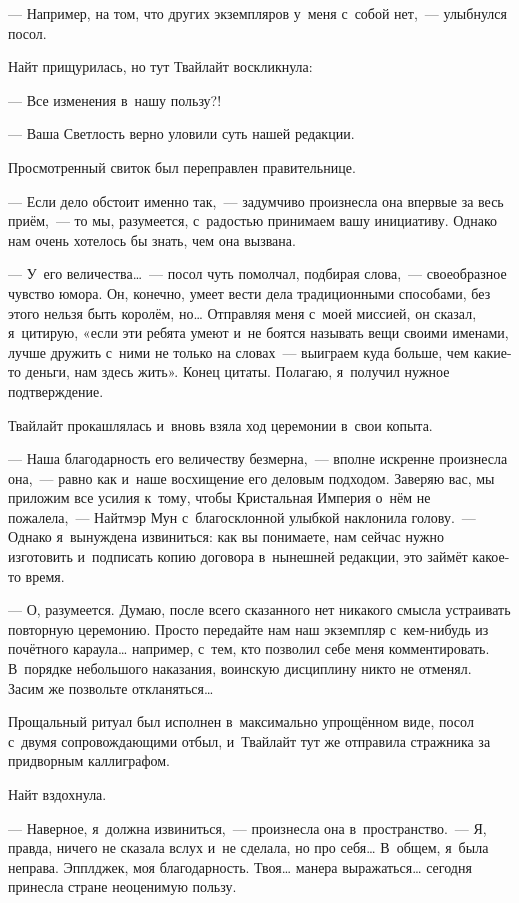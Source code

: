\documentclass[twoside,a5paper,12pt]{extbook}
\begin{document}
— Например, на том, что других экземпляров у меня с собой нет, — улыбнулся посол.

Найт прищурилась, но тут Твайлайт воскликнула:

— Все изменения в нашу пользу?!

— Ваша Светлость верно уловили суть нашей редакции.

Просмотренный свиток был переправлен правительнице.

— Если дело обстоит именно так, — задумчиво произнесла она впервые за весь приём, — то мы, разумеется, с радостью принимаем вашу инициативу. Однако нам очень хотелось бы знать, чем она вызвана.

— У его величества… — посол чуть помолчал, подбирая слова, — своеобразное чувство юмора. Он, конечно, умеет вести дела традиционными способами, без этого нельзя быть королём, но… Отправляя меня с моей миссией, он сказал, я цитирую, «если эти ребята умеют и не боятся называть вещи своими именами, лучше дружить с ними не только на словах — выиграем куда больше, чем какие-то деньги, нам здесь жить». Конец цитаты. Полагаю, я получил нужное подтверждение.

Твайлайт прокашлялась и вновь взяла ход церемонии в свои копыта.

— Наша благодарность его величеству безмерна, — вполне искренне произнесла она, — равно как и наше восхищение его деловым подходом. Заверяю вас, мы приложим все усилия к тому, чтобы Кристальная Империя о нём не пожалела, — Найтмэр Мун с благосклонной улыбкой наклонила голову. — Однако я вынуждена извиниться: как вы понимаете, нам сейчас нужно изготовить и подписать копию договора в нынешней редакции, это займёт какое-то время.

— О, разумеется. Думаю, после всего сказанного нет никакого смысла устраивать повторную церемонию. Просто передайте нам наш экземпляр с кем-нибудь из почётного караула… например, с тем, кто позволил себе меня комментировать. В порядке небольшого наказания, воинскую дисциплину никто не отменял. Засим же позвольте откланяться…

Прощальный ритуал был исполнен в максимально упрощённом виде, посол с двумя сопровождающими отбыл, и Твайлайт тут же отправила стражника за придворным каллиграфом.

Найт вздохнула.

— Наверное, я должна извиниться, — произнесла она в пространство. — Я, правда, ничего не сказала вслух и не сделала, но про себя… В общем, я была неправа. Эпплджек, моя благодарность. Твоя… манера выражаться… сегодня принесла стране неоценимую пользу.
\end{document}
